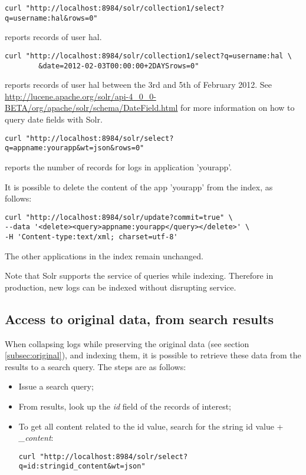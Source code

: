 \documentclass[twoside,11pt]{article}
\begin{document}
\begin{verbatim}
curl "http://localhost:8984/solr/collection1/select?q=username:hal&rows=0"
\end{verbatim}
reports records of user hal.

\begin{verbatim}
curl "http://localhost:8984/solr/collection1/select?q=username:hal \
        &date=2012-02-03T00:00:00+2DAYSrows=0"
\end{verbatim}
reports records of user hal between the 3rd and 5th of February 2012. See \url{http://lucene.apache.org/solr/api-4_0_0-BETA/org/apache/solr/schema/DateField.html} for more information on how to query date fields with Solr.

\begin{verbatim}
curl "http://localhost:8984/solr/select?q=appname:yourapp&wt=json&rows=0"
\end{verbatim}
reports the number of records for logs in application 'yourapp'.

It is possible to delete the content of the app 'yourapp' from the index, as follows:

\begin{verbatim}
curl "http://localhost:8984/solr/update?commit=true" \
--data '<delete><query>appname:yourapp</query></delete>' \
-H 'Content-type:text/xml; charset=utf-8'
\end{verbatim}
The other applications in the index remain unchanged.

Note that Solr supports the service of queries while indexing. Therefore in production, new logs can be indexed without disrupting service.

\subsection{Access to original data, from search results}
When collapsing logs while preserving the original data (see section \ref{subsec:original}), and indexing them, it is possible to retrieve these data from the results to a search query. The steps are as follows:

\begin{itemize}
\item Issue a search query;
\item From results, look up the \emph{id} field of the records of interest;
\item To get all content related to the id value, search for the string id value + \emph{\_content}:

\begin{verbatim}
curl "http://localhost:8984/solr/select?q=id:stringid_content&wt=json"
\end{verbatim}
\end{itemize}
\end{document}
